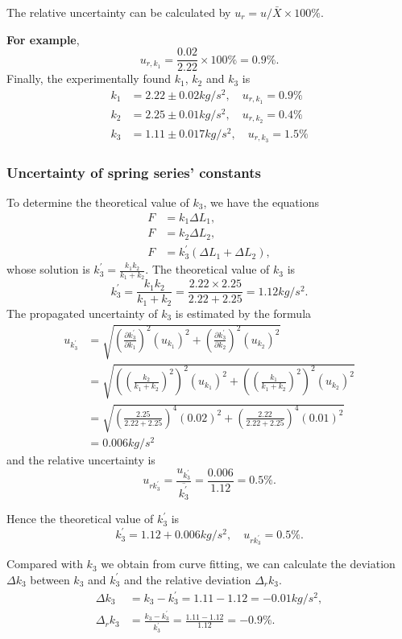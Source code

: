     The relative uncertainty can be calculated by $u_r=u/\bar{X}\times100\%$.

    \textbf{For example},
    \[
        u_{r,k_1}=\frac{0.02}{2.22}\times100\%=0.9\%.
    \]
    Finally, the experimentally found $k_1$, $k_2$ and $k_3$ is
    \[
    \begin{split}
        k_1&= 2.22\pm 0.02 kg/s^2,\quad u_{r,k_1}=0.9\%\\
        k_2&= 2.25\pm 0.01 kg/s^2,\quad u_{r,k_2}=0.4\%\\
        k_3&= 1.11\pm 0.017kg/s^2,\quad u_{r,k_3}=1.5\%
    \end{split}
    \]

\subsubsection{Uncertainty of spring series' constants}
    To determine the theoretical value of $k_3$, we have the equations
    \[
    \begin{split}
        F&=k_1\Delta L_1,\\
        F&=k_2\Delta L_2,\\
        F&=k_3^{'}(\Delta L_1+\Delta L_2),
    \end{split}
    \]
    whose solution is $k_3^{'}=\frac{k_1k_2}{k_1+k_2}$. The theoretical value of $k_3$ is
    \[
        k_3^{'}=\frac{k_1k_2}{k_1+k_2}=\frac{2.22\times2.25}{2.22+2.25}=1.12kg/s^2.
    \]
    The propagated uncertainty of $k_3$ is estimated by the formula
    \[
    \begin{split}
        u_{k_3^{'}}&=\sqrt{(\frac{\partial k_3^{'}}{\partial k_1})^2(u_{k_1})^2+(\frac{\partial k_3^{'}}{\partial k_2})^2(u_{k_2})^2}\\[0.3cm]
        &=\sqrt{((\frac{k_2}{k_1+k_2})^2)^2(u_{k_1})^2+((\frac{k_1}{k_1+k_2})^2)^2(u_{k_2})^2}\\[0.3cm]
        &=\sqrt{(\frac{2.25}{2.22+2.25})^4(0.02)^2+(\frac{2.22}{2.22+2.25})^4(0.01)^2}\\[0.3cm]
        &=0.006kg/s^2
    \end{split}
    \]
    and the relative uncertainty is
    \[
        u_{rk_3^{'}}=\frac{u_{k_3^{'}}}{\overline{k_3^{'}}}=\frac{0.006}{1.12}=0.5\%.
    \]

    Hence the theoretical value of $k_3^{'}$ is
    \[
        k_3^{'}=1.12+0.006 kg/s^2,\quad u_{rk_3^{'}}=0.5\%.
    \]
    
    Compared with $k_3$ we obtain from curve fitting, we can calculate the deviation $\Delta k_3$ between $k_3$ and $k_3^{'}$ and the relative deviation $\Delta_r k_3$.
    \[ 
    \begin{split}
        \Delta k_3&=k_3-k_3^{'}=1.11-1.12=-0.01kg/s^2,\\
        \Delta_r k_3&=\frac{k_3-k_3^{'}}{k_3^{'}}=\frac{1.11-1.12}{1.12}=-0.9\%.
    \end{split}
    \]


